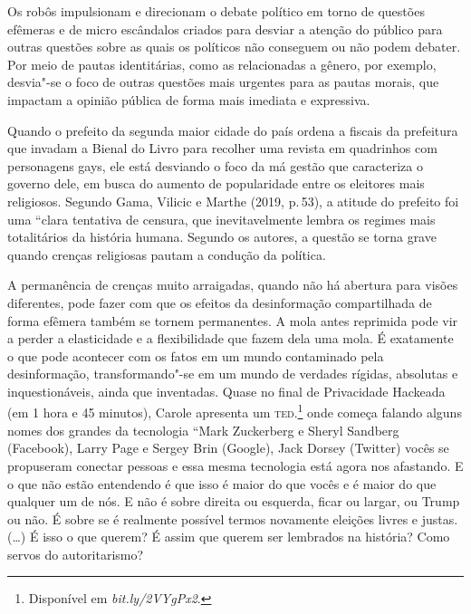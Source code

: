Os robôs impulsionam e direcionam o debate político em torno de questões
efêmeras e de micro escândalos criados para desviar a atenção do público
para outras questões sobre as quais os políticos não conseguem ou não
podem debater. Por meio de pautas identitárias, como as relacionadas a
gênero, por exemplo, desvia"-se o foco de outras questões mais urgentes
para as pautas morais, que impactam a opinião pública de forma mais
imediata e expressiva.

Quando o prefeito da segunda maior cidade do país ordena a fiscais da
prefeitura que invadam a Bienal do Livro para recolher uma revista em
quadrinhos com personagens gays, ele está desviando o foco da má gestão
que caracteriza o governo dele, em busca do aumento de popularidade
entre os eleitores mais religiosos. Segundo Gama, Vilicic e Marthe
(2019, p.\,53), a atitude do prefeito foi uma ``clara tentativa de
censura, que inevitavelmente lembra os regimes mais totalitários da
história humana. Segundo os autores, a questão se torna grave quando
crenças religiosas pautam a condução da política.

A permanência de crenças muito arraigadas, quando não há abertura para
visões diferentes, pode fazer com que os efeitos da desinformação
compartilhada de forma efêmera também se tornem permanentes. A mola
antes reprimida pode vir a perder a elasticidade e a flexibilidade que
fazem dela uma mola. É exatamente o que pode acontecer com os fatos em
um mundo contaminado pela desinformação, transformando"-se em um mundo de
verdades rígidas, absolutas e inquestionáveis, ainda que inventadas.
Quase no final de Privacidade Hackeada (em 1 hora e 45 minutos), Carole
apresenta um \textsc{ted}.\footnote{Disponível em \textit{bit.ly/2VYgPx2}.} onde começa falando alguns nomes dos grandes
da tecnologia ``Mark Zuckerberg e Sheryl Sandberg (Facebook), Larry Page
e Sergey Brin (Google), Jack Dorsey (Twitter) vocês se propuseram
conectar pessoas e essa mesma tecnologia está agora nos afastando. E o
que não estão entendendo é que isso é maior do que vocês e é maior do
que qualquer um de nós. E não é sobre direita ou esquerda, ficar ou
largar, ou Trump ou não. É sobre se é realmente possível termos
novamente eleições livres e justas. (\ldots{}) É isso o que querem? É assim
que querem ser lembrados na história? Como servos do autoritarismo?

